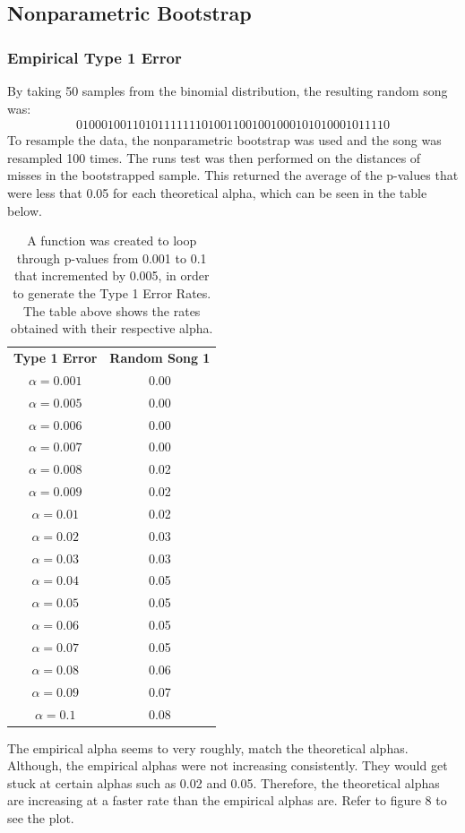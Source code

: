 \documentclass[12pt, letterpaper]{article}
\begin{document}
\subsection{Nonparametric Bootstrap}
\subsubsection{Empirical Type 1 Error} 
By taking 50 samples from the binomial distribution, the resulting random song was:
\begin{gather*}
  0 1 0 0 0 1 0 0 1 1 0 1 0 1 1 1 1 1 1 1 0 
  1 0 0 1 1 0 0 1 0 0 1 0 0 0 1 0 1 0 1 0 0
  0 1 0 1 1 1 1 0
\end{gather*} 
To resample the data, the nonparametric bootstrap was used and the song was resampled 100 times. The runs test was then performed on the distances of misses in the bootstrapped sample. This returned the average of the p-values that were less that 0.05 for each theoretical alpha, which can be seen in the table below.

\begin{table}[hb]
\begin{center}
\begin{tabular}{|c|c|}
\textbf{Type 1 Error} & \textbf{Random Song 1}\\
$\alpha = 0.001$ & 0.00\\
$\alpha = 0.005$ &  0.00\\
$\alpha = 0.006$ &  0.00\\
$\alpha = 0.007$ & 0.00\\
$\alpha = 0.008$ & 0.02\\
$\alpha = 0.009$ & 0.02\\
$\alpha = 0.01$ & 0.02\\
$\alpha = 0.02$ & 0.03\\
$\alpha = 0.03$ & 0.03\\
$\alpha = 0.04$ & 0.05\\
$\alpha = 0.05$ &  0.05\\
$\alpha = 0.06$ &  0.05\\
$\alpha = 0.07$ &  0.05\\
$\alpha = 0.08$ &  0.06\\
$\alpha = 0.09$ & 0.07\\
$\alpha = 0.1$ & 0.08 \\ 
\end{tabular}
\end{center}
\caption{A function was created to loop through p-values from 0.001 to 0.1 that incremented by 0.005, in order to  generate the Type 1 Error Rates. The table above shows the rates obtained with their respective alpha.}
\label{fig: Type 1 Error Rates for Nonparametric Bootstrap}
\end{table}
The empirical alpha seems to very roughly, match the theoretical alphas. Although, the empirical alphas were not increasing consistently. They would get stuck at certain alphas such as 0.02 and 0.05. Therefore, the theoretical alphas are increasing at a faster rate than the empirical alphas are. Refer to figure 8 to see the plot.
\end{document}
